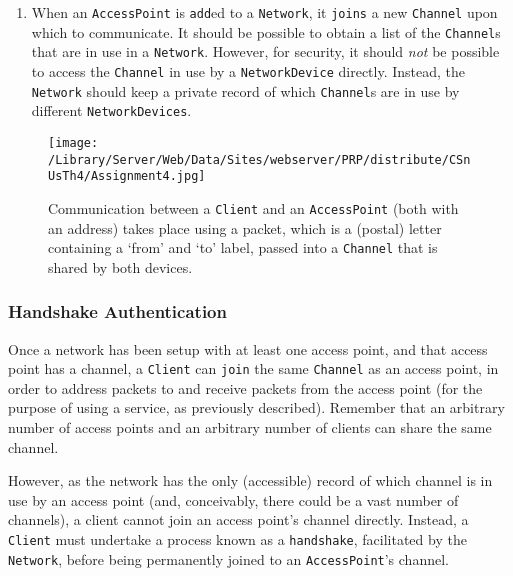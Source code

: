 \documentclass[11pt]{article}
\begin{document}
\begin{enumerate}
	\item When an \texttt{AccessPoint} is \texttt{add}ed to a \texttt{Network}, it \texttt{joins} a new \texttt{Channel}  upon which to communicate. It should be possible to obtain a list of the \texttt{Channel}s that are in use in a \texttt{Network}. However, for security, it should \emph{not} be possible to access the \texttt{Channel} in use by a \texttt{NetworkDevice} directly. Instead, the \texttt{Network} should keep a private record of which \texttt{Channel}s are in use by different \texttt{NetworkDevices}.
		
\end{enumerate}

\begin{figure}
  	
	\centering
 		
	\texttt{[image: /Library/Server/Web/Data/Sites/webserver/PRP/distribute/CSnUsTh4/Assignment4.jpg]}

	\caption{Communication between a \texttt{Client} and an \texttt{AccessPoint} (both with an address) takes place using a packet, which is a (postal) letter containing a `from' and `to' label, passed into a \texttt{Channel} that is shared by both devices.}

	\label{fig:assignment4}

\end{figure}

\subsubsection{Handshake Authentication}

	Once a network has been setup with at least one access point, and that access point has a channel, a \texttt{Client} can \texttt{join} the same \texttt{Channel} as an access point, in order to address packets to and receive packets from the access point (for the purpose of using a service, as previously described). Remember that an arbitrary number of access points and an arbitrary number of clients can share the same channel.
	
	However, as the network has the only (accessible) record of which channel is in use by an access point (and, conceivably, there could be a vast number of channels), a client cannot join an access point's channel directly. Instead, a \texttt{Client} must undertake a process known as a \texttt{handshake}, facilitated by the \texttt{Network}, before being permanently joined to an \texttt{AccessPoint}'s channel. 
	
\end{document}
